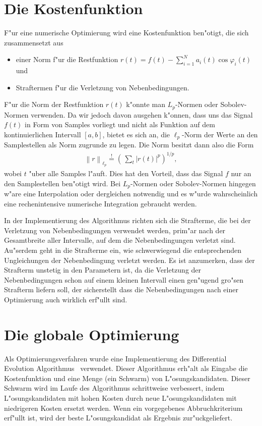 \documentclass[a4paper]{scrartcl}
\newcommand{\norm}[1]{{\left\lVert#1\right\rVert}}
\newcommand{\pphi}{{\varphi}}
\newcommand{\defeq}{\overset{!}{=}}
\begin{document}
\section{Die Kostenfunktion}

F"ur eine numerische Optimierung wird eine Kostenfunktion ben"otigt, die sich zusammensetzt aus
\begin{itemize}
 \item einer Norm f"ur die Restfunktion $r(t) = f(t) - \sum_{i=1}^N a_i(t)\cos\pphi_i(t)$ und
 \item Straftermen f"ur die Verletzung von Nebenbedingungen. 
\end{itemize}
F"ur die Norm der Restfunktion $r(t)$ k"onnte man $L_p$-Normen oder Sobolev-Normen verwenden. 
Da wir jedoch davon ausgehen k"onnen, dass uns das Signal~$f(t)$ in Form von Samples vorliegt und nicht als Funktion auf dem kontinuierlichen Intervall $[a,b]$, bietet es sich an, die $\ell_p$-Norm der Werte an den Samplestellen als Norm zugrunde zu legen. 
Die Norm besitzt dann also die Form
\begin{align} \label{eq:lpnormr}
\norm{r}_{\ell_p} \defeq \left(\,\sum_{t}\lvert r(t)\rvert^p\right)^{1/p},
\end{align}
wobei $t$ "uber alle Samples l"auft. 
Dies hat den Vorteil, dass das Signal $f$ nur an den Samplestellen ben"otigt wird. 
Bei $L_p$-Normen oder Sobolev-Normen hingegen w"are eine Interpolation oder dergleichen notwendig und es w"urde wahrscheinlich eine rechenintensive numerische Integration gebraucht werden. 

In der Implementierung des Algorithmus richten sich die Strafterme, die bei der Verletzung von Nebenbedingungen verwendet werden, prim"ar nach der Gesamtbreite aller Intervalle, auf dem die Nebenbedingungen verletzt sind. 
Au"serdem geht in die Strafterme ein, wie schwerwiegend die entsprechenden Ungleichungen der Nebenbedingung verletzt werden. 
Es ist anzumerken, dass der Strafterm unstetig in den Parametern ist, da die Verletzung der Nebenbedingungen schon auf einem kleinen Intervall einen gen"ugend gro"sen Strafterm liefern soll, der sicherstellt dass die Nebenbedingungen nach einer Optimierung auch wirklich erf"ullt sind. 


\section{Die globale Optimierung}

Als Optimierungsverfahren wurde eine Implementierung des Differential Evolution Algorithmus~\citep*{StPr1997} verwendet. 
Dieser Algorithmus erh"alt als Eingabe die Kostenfunktion und eine Menge (ein Schwarm) von L"osungskandidaten. 
Dieser Schwarm wird im Laufe des Algorithmus schrittweise verbessert, indem L"osungskandidaten mit hohen Kosten durch neue L"osungskandidaten mit niedrigeren Kosten ersetzt werden. 
Wenn ein vorgegebenes Abbruchkriterium erf"ullt ist, wird der beste L"osungskandidat als Ergebnis zur"uckgeliefert. 
\end{document}
